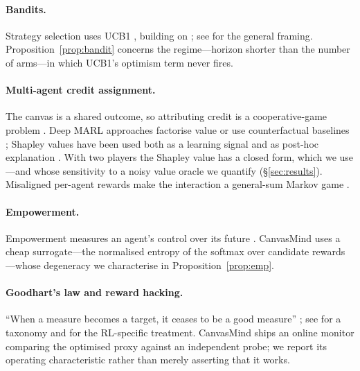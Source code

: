 \documentclass[11pt]{article}
\theoremstyle{plain}
\theoremstyle{definition}
\begin{document}
\paragraph{Bandits.}
Strategy selection uses UCB1 \citep{auer2002finite}, building on
\citet{lai1985asymptotically}; see \citet{sutton2018reinforcement} for the
general framing. Proposition~\ref{prop:bandit} concerns the regime---horizon
shorter than the number of arms---in which UCB1's optimism term never fires.

\paragraph{Multi-agent credit assignment.}
The canvas is a shared outcome, so attributing credit is a cooperative-game
problem \citep{shapley1953value}. Deep MARL approaches factorise value
\citep{sunehag2018value,rashid2018qmix} or use counterfactual baselines
\citep{foerster2018counterfactual}; Shapley values have been used both as a
learning signal \citep{wang2020shapley} and as post-hoc explanation
\citep{heuillet2022collective}. With two players the Shapley value has a closed
form, which we use---and whose sensitivity to a noisy value oracle we quantify
(\S\ref{sec:results}). Misaligned per-agent rewards make the interaction a
general-sum Markov game \citep{littman1994markov,lowe2017multi}.

\paragraph{Empowerment.}
Empowerment measures an agent's control over its future
\citep{klyubin2005empowerment,salge2014empowerment,mohamed2015variational}.
CanvasMind uses a cheap surrogate---the normalised entropy of the softmax over
candidate rewards---whose degeneracy we characterise in
Proposition~\ref{prop:emp}.

\paragraph{Goodhart's law and reward hacking.}
``When a measure becomes a target, it ceases to be a good measure''
\citep{goodhart1984problems,strathern1997improving}; see
\citet{manheim2018categorizing} for a taxonomy and
\citet{amodei2016concrete,skalse2022defining,pan2022effects,casper2023open} for
the RL-specific treatment. CanvasMind ships an online monitor comparing the
optimised proxy against an independent probe; we report its operating
characteristic rather than merely asserting that it works.
\end{document}

